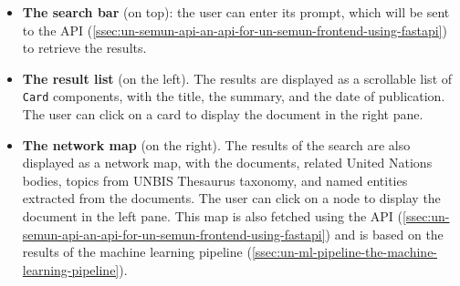 \begin{itemize}
    \item \textbf{The search bar} (on top): the user can enter its prompt, which will be sent to the API (\ref{ssec:un-semun-api-an-api-for-un-semun-frontend-using-fastapi}) to retrieve the results.
    \item \textbf{The result list} (on the left). The results are displayed as a scrollable list of \texttt{Card} components, with the title, the summary, and the date of publication. The user can click on a card to display the document in the right pane.
    \item \textbf{The network map} (on the right). The results of the search are also displayed as a network map, with the documents, related United Nations bodies, topics from UNBIS Thesaurus taxonomy, and named entities extracted from the documents. The user can click on a node to display the document in the left pane. This map is also fetched using the API (\ref{ssec:un-semun-api-an-api-for-un-semun-frontend-using-fastapi}) and is based on the results of the machine learning pipeline (\ref{ssec:un-ml-pipeline-the-machine-learning-pipeline}).
\end{itemize}

